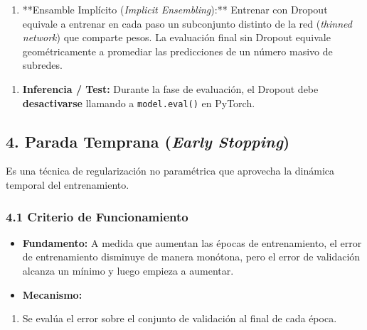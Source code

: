 \documentclass[11pt,oneside]{article}
\begin{document}
\begin{enumerate}

\item **Ensamble Implícito (\emph{Implicit Ensembling}):** Entrenar con Dropout equivale a entrenar en cada paso un subconjunto distinto de la red (\emph{thinned network}) que comparte pesos. La evaluación final sin Dropout equivale geométricamente a promediar las predicciones de un número masivo de subredes.

\end{enumerate}

\begin{enumerate}

\item \textbf{Inferencia / Test:} Durante la fase de evaluación, el Dropout debe \textbf{desactivarse} llamando a \texttt{model.eval()} en PyTorch.

\end{enumerate}

\subsection{4. Parada Temprana (\emph{Early Stopping})}

Es una técnica de regularización no paramétrica que aprovecha la dinámica temporal del entrenamiento.

\subsubsection{4.1 Criterio de Funcionamiento}

\begin{itemize}

\item \textbf{Fundamento:} A medida que aumentan las épocas de entrenamiento, el error de entrenamiento disminuye de manera monótona, pero el error de validación alcanza un mínimo y luego empieza a aumentar.

\end{itemize}

\begin{itemize}

\item \textbf{Mecanismo:}

\end{itemize}

\begin{enumerate}

\item Se evalúa el error sobre el conjunto de validación al final de cada época.

\end{enumerate}
\end{document}
